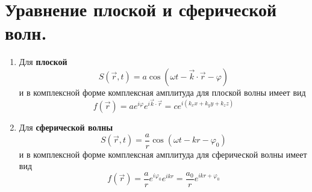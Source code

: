 \documentclass[a4paper, 12pt]{book}
\begin{document}
	\section{Уравнение плоской и сферической волн.}
	\begin{enumerate}
		\item Для \textbf{плоской}
		\begin{equation*}
			S\left(\vec{r},t\right)=a\cos\left(\omega t-\vec{k}\cdot\vec{r}-\varphi\right)
		\end{equation*}
		и в комплексной форме комплексная амплитуда для плоской волны имеет вид
		\begin{equation*}
			f\left(\vec{r}\right)=ae^{i\varphi}e^{i\vec{k}\cdot\vec{r}}=ce^{i\left(k_xx+k_yy+k_zz\right)}
		\end{equation*}
		\item Для \textbf{сферической волны}
		\begin{equation*}
			S\left(\vec{r},t\right)=\frac{a}{r}\cos\left(\omega t-kr-\varphi_0\right)
		\end{equation*}
		и в комплексной форме комплексная амплитуда для сферической волны имеет вид
		\begin{equation*}
			f\left(\vec{r}\right)=\frac{a}{r}e^{i\varphi_0}e^{ikr}=\frac{a_0}{r}e^{ikr+\varphi_0}
		\end{equation*}
	\end{enumerate}
\end{document}
